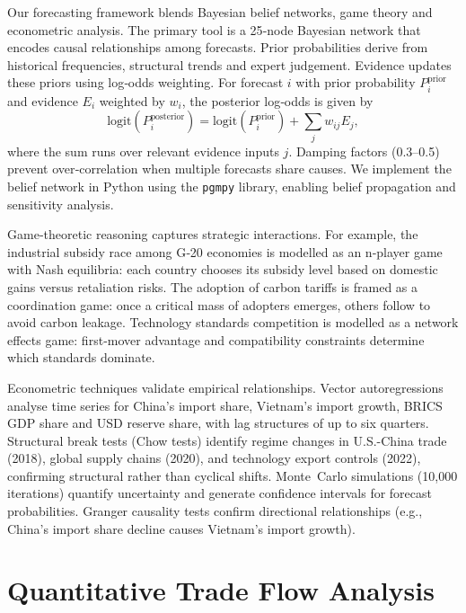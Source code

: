 \documentclass[12pt]{article}
\begin{document}
Our forecasting framework blends Bayesian belief networks, game theory and econometric analysis.  The primary tool is a 25‑node Bayesian network that encodes causal relationships among forecasts.  Prior probabilities derive from historical frequencies, structural trends and expert judgement.  Evidence updates these priors using log‑odds weighting.  For forecast $i$ with prior probability $P_i^{\text{prior}}$ and evidence $E_i$ weighted by $w_i$, the posterior log‑odds is given by
\begin{equation}
\text{logit}(P_i^{\text{posterior}}) = \text{logit}(P_i^{\text{prior}}) + \sum_j w_{ij} E_j,
\end{equation}
where the sum runs over relevant evidence inputs $j$.  Damping factors (0.3–0.5) prevent over‑correlation when multiple forecasts share causes.  We implement the belief network in Python using the \texttt{pgmpy} library, enabling belief propagation and sensitivity analysis.

Game‑theoretic reasoning captures strategic interactions.  For example, the industrial subsidy race among G‑20 economies is modelled as an n‑player game with Nash equilibria: each country chooses its subsidy level based on domestic gains versus retaliation risks.  The adoption of carbon tariffs is framed as a coordination game: once a critical mass of adopters emerges, others follow to avoid carbon leakage.  Technology standards competition is modelled as a network effects game: first‑mover advantage and compatibility constraints determine which standards dominate.

Econometric techniques validate empirical relationships.  Vector autoregressions analyse time series for China’s import share, Vietnam’s import growth, BRICS GDP share and USD reserve share, with lag structures of up to six quarters.  Structural break tests (Chow tests) identify regime changes in U.S.-China trade (2018), global supply chains (2020), and technology export controls (2022), confirming structural rather than cyclical shifts.  Monte Carlo simulations (10,000 iterations) quantify uncertainty and generate confidence intervals for forecast probabilities.  Granger causality tests confirm directional relationships (e.g., China’s import share decline causes Vietnam’s import growth).

\section{Quantitative Trade Flow Analysis}
\end{document}
